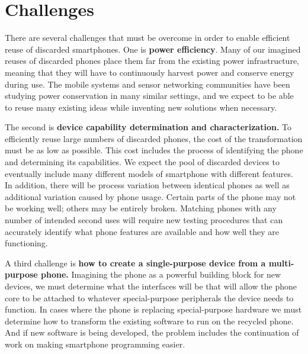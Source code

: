 
\section{Challenges}
\label{sec-technical}

There are several challenges that must be overcome in order to enable
efficient reuse of discarded smartphones. One is \textbf{power efficiency}.
Many of our imagined reuses of discarded phones place them far from the
existing power infrastructure, meaning that they will have to continuously
harvest power and conserve energy during use. The mobile systems and sensor
networking communities have been studying power conservation in many similar
settings, and we expect to be able to reuse many existing ideas while
inventing new solutions when necessary.

The second is \textbf{device capability determination and characterization.}
To efficiently reuse large numbers of discarded phones, the cost of the
transformation must be as low as possible. This cost includes the process of
identifying the phone and determining its capabilities. We expect the pool of
discarded devices to eventually include many different models of smartphone
with different features. In addition, there will be process variation between
identical phones as well as additional variation caused by phone usage.
Certain parts of the phone may not be working well; others may be entirely
broken. Matching phones with any number of intended second uses will require
new testing procedures that can accurately identify what phone features are
available and how well they are functioning.

A third challenge is \textbf{how to create a single-purpose device from a
multi-purpose phone.} Imagining the phone as a powerful building block for
new devices, we must determine what the interfaces will be that will allow
the phone core to be attached to whatever special-purpose peripherals the
device needs to function. In cases where the phone is replacing
special-purpose hardware we must determine how to transform the existing
software to run on the recycled phone. And if new software is being
developed, the problem includes the continuation of work on making smartphone
programming easier.

